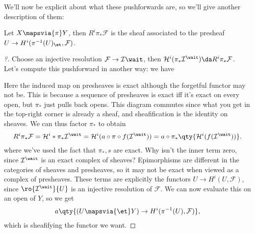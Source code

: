 We'll now be explicit about what these pushforwards are, so we'll give
another description of them:

\begin{proposition}[?]

Let \(X \mapsvia{\pi} Y\), then \(R^i \pi_* \mathcal{F}\) is the sheaf
associated to the presheaf \(U\to H^i(\pi^{-1}(U)_\et, \mathcal{F})\).

\end{proposition}

\begin{proof}[?]

Choose an injective resolution \(\mathcal{F}\to \mathcal{I}\wait\), then
\(\mathcal{H}^i(\pi_* \mathcal{I}^\wait) \da R^i \pi_* \mathcal{F}\).
Let's compute this pushforward in another way: we have

\begin{center}
\end{center}

Here the induced map on presheaves is exact although the forgetful
functor may not be. This is because a sequence of presheaves is exact
iff it's exact on every open, but \(\pi_*\) just pulls back opens. This
diagram commutes since what you get in the top-right corner is already a
sheaf, and sheafification is the identity on sheaves. We can thus factor
\(\pi_*\) to obtain
\begin{align*}  
R^i \pi_* \mathcal{F} = \mathcal{H}^i*\pi_* \mathcal{I}^\wait
= \mathcal{H}^i(a\circ \pi \circ f (\mathcal{I}^\wait))
= a\circ \pi_*\qty{\mathcal{H}^i(f(\mathcal{I}^\wait)) }
.\end{align*} where we've used the fact that \(\pi_*, s\) are exact. Why
isn't the inner term zero, since \(\mathcal{I}^\wait\) is an exact
complex of sheaves? Epimorphisms are different in the categories of
sheaves and presheaves, so it may not be exact when viewed as a complex
of presheaves. These terms are explicitly the functors
\(U\to H^i(U, \mathcal{F})\), since \(\ro{\mathcal{I}^\wait}{U}\) is an
injective resolution of \(\mathcal{F}\). We can now evaluate this on an
open of \(Y\), so we get
\begin{align*}  
a \qty{ (U \mapsvia{\et} Y) \to H^i(\pi^{-1}(U), \mathcal{F}) }
,\end{align*} which is sheafifying the functor we want.

\end{proof}

